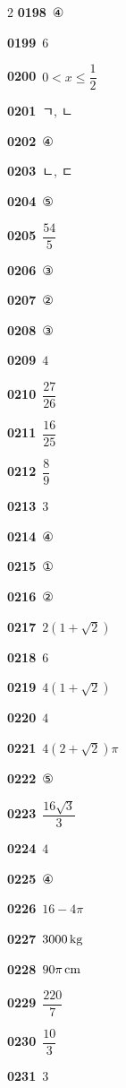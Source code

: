 \documentclass[10pt,a4paper]{article}
\begin{document}
\begin{multicols}{2}
\noindent\textbf{0198}\ ④\par
\noindent\textbf{0199}\ $6$\par
\noindent\textbf{0200}\ $0<x\le\dfrac{1}{2}$\par
\noindent\textbf{0201}\ ㄱ, ㄴ\par
\noindent\textbf{0202}\ ④\par
\noindent\textbf{0203}\ ㄴ, ㄷ\par
\noindent\textbf{0204}\ ⑤\par
\noindent\textbf{0205}\ $\dfrac{54}{5}$\par
\noindent\textbf{0206}\ ③\par
\noindent\textbf{0207}\ ②\par
\noindent\textbf{0208}\ ③\par
\noindent\textbf{0209}\ $4$\par
\noindent\textbf{0210}\ $\dfrac{27}{26}$\par
\noindent\textbf{0211}\ $\dfrac{16}{25}$\par
\noindent\textbf{0212}\ $\dfrac{8}{9}$\par
\noindent\textbf{0213}\ $3$\par
\noindent\textbf{0214}\ ④\par
\noindent\textbf{0215}\ ①\par
\noindent\textbf{0216}\ ②\par
\noindent\textbf{0217}\ $2(1+\sqrt{2})$\par
\noindent\textbf{0218}\ $6$\par
\noindent\textbf{0219}\ $4(1+\sqrt{2})$\par
\noindent\textbf{0220}\ $4$\par
\noindent\textbf{0221}\ $4(2+\sqrt{2})\pi$\par
\noindent\textbf{0222}\ ⑤\par
\noindent\textbf{0223}\ $\dfrac{16\sqrt{3}}{3}$\par
\noindent\textbf{0224}\ $4$\par
\noindent\textbf{0225}\ ④\par
\noindent\textbf{0226}\ $16-4\pi$\par
\noindent\textbf{0227}\ $3000\mkern3mu \mathrm{kg}$\par
\noindent\textbf{0228}\ $90\pi\mkern3mu \mathrm{cm}$\par
\noindent\textbf{0229}\ $\dfrac{220}{7}$\par
\noindent\textbf{0230}\ $\dfrac{10}{3}$\par
\noindent\textbf{0231}\ $3$\par

\end{multicols}
\end{document}
